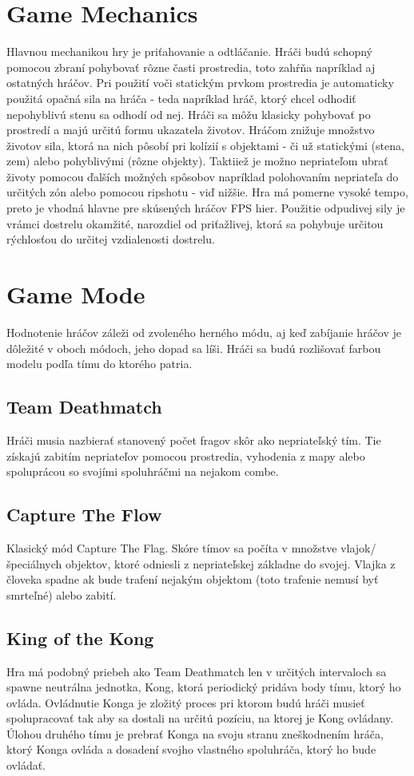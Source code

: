 \documentclass[a4paper]{report}
\begin{document}
\section{Game Mechanics}
 Hlavnou mechanikou hry je priťahovanie a odtláčanie. Hráči budú schopný pomocou zbraní pohybovať rôzne časti prostredia, toto zahŕňa napríklad aj ostatných hráčov. Pri použití voči statickým prvkom prostredia je automaticky použitá opačná sila na hráča - teda napríklad hráč, ktorý chcel odhodiť nepohyblivú stenu sa odhodí od nej. Hráči sa môžu klasicky pohybovať po prostredí a majú určitú formu ukazatela životov. Hráčom znižuje množstvo životov sila, ktorá na nich pôsobí pri kolízií s objektami - či už statickými (stena, zem) alebo pohyblivými (rôzne objekty). Taktiiež je možno nepriateľom ubrať životy pomocou ďalších možných spôsobov napríklad polohovaním nepriateľa do určitých zón alebo pomocou ripshotu - viď nižšie.  Hra má pomerne vysoké tempo, preto je vhodná hlavne pre skúsených hráčov FPS hier. Použitie odpudivej sily je vrámci dostrelu okamžité, narozdiel od priťažlivej, ktorá sa pohybuje určitou rýchlosťou do určitej vzdialenosti dostrelu.

\section{Game Mode}
Hodnotenie hráčov záleži od zvoleného herného módu, aj keď zabíjanie hráčov je dôležité v oboch módoch, jeho dopad sa líši. Hráči sa budú rozlišovať farbou modelu podľa tímu do ktorého patria.
\subsection{Team Deathmatch}
Hráči musia nazbierať stanovený počet fragov skôr ako nepriateľský tím. Tie získajú zabitím nepriateľov pomocou prostredia, vyhodenia z mapy alebo spoluprácou so svojími spoluhráčmi na nejakom combe.

\subsection{Capture The Flow}
Klasický mód Capture The Flag.
Skóre tímov sa počíta v množstve vlajok/špeciálnych objektov, ktoré odniesli z nepriateľskej základne do svojej. Vlajka z človeka spadne ak bude trafení nejakým objektom (toto trafenie nemusí byť smrteľné) alebo zabití.

\subsection{King of the Kong}
Hra má podobný priebeh ako Team Deathmatch len v určitých intervaloch sa spawne neutrálna jednotka, Kong, ktorá periodický pridáva body tímu, ktorý ho ovláda. Ovládnutie Konga je zložitý proces pri ktorom budú hráči musieť spolupracovať tak aby sa dostali na určitú pozíciu, na ktorej je Kong ovládany. Úlohou druhého tímu je prebrať Konga na svoju stranu zneškodnením hráča, ktorý Konga ovláda a dosadení svojho vlastného spoluhráča, ktorý ho bude ovládať. 
\end{document}
